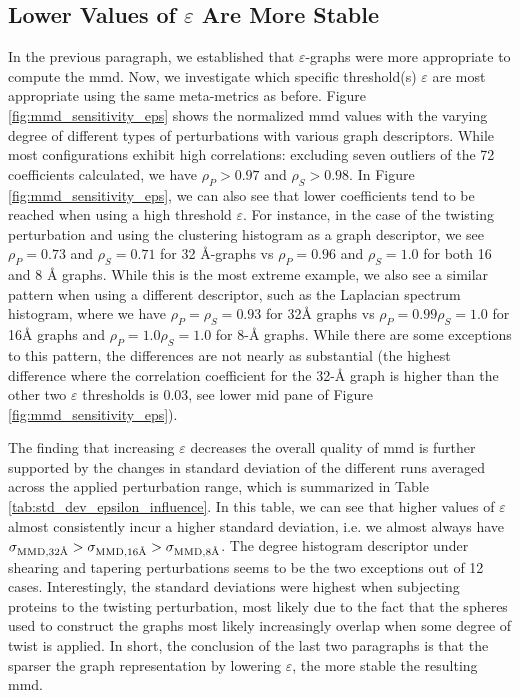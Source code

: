 \subsection{Lower Values of $\varepsilon$ Are More Stable}
\label{sec:sparser_better}
In the previous paragraph, we established that $\varepsilon$-graphs were more
appropriate to compute the \gls{mmd}. Now, we investigate which specific
threshold(s) $\varepsilon$ are most appropriate using the same meta-metrics as
before. Figure \ref{fig:mmd_sensitivity_eps} shows the normalized \gls{mmd} values
with the varying degree of different types of perturbations with various graph
descriptors. While most configurations exhibit high correlations: excluding
seven outliers of the 72 coefficients calculated, we have $\rho_P>0.97$ and
$\rho_S>0.98$. In Figure \ref{fig:mmd_sensitivity_eps}, we can also see that
lower coefficients tend to be reached when using a high threshold $\varepsilon$.
For instance, in the case of the twisting perturbation and using the clustering
histogram as a graph descriptor, we see $\rho_P=0.73$ and $\rho_S=0.71$ for 32
\si{\angstrom}-graphs vs $\rho_P=0.96$ and $\rho_S=1.0$ for both 16 and 8
\si{\angstrom} graphs. While this is the most extreme example, we also see a
similar pattern when using a different descriptor, such as the Laplacian
spectrum histogram, where we have $\rho_P=\rho_S=0.93$ for 32\si{\angstrom}
graphs vs $\rho_P=0.99 \rho_S=1.0$ for 16\si{\angstrom} graphs and $\rho_P=1.0
\rho_S=1.0$ for 8-\si{\angstrom} graphs. While there are some exceptions to this
pattern, the differences are not nearly as substantial (the highest difference
where the correlation coefficient for the 32-\si{\angstrom} graph is higher than
the other two $\varepsilon$ thresholds is 0.03, see lower mid pane of Figure
\ref{fig:mmd_sensitivity_eps}).

The finding that increasing $\varepsilon$ decreases the overall quality of \gls{mmd}
is further supported by the changes in standard deviation of the different runs
averaged across the applied perturbation range, which is summarized in Table
\ref{tab:std_dev_epsilon_influence}. In this table, we can see that higher
values of $\varepsilon$ almost consistently incur a higher standard deviation,
i.e. we almost always have $\sigma_{\text{MMD}, 32\si{\angstrom}}>\sigma_{\text{MMD},
  16\si{\angstrom}}>\sigma_{\text{MMD}, 8\si{\angstrom}}$. The degree histogram descriptor under shearing
and tapering perturbations seems to be the two exceptions out of 12 cases.
Interestingly, the standard deviations were highest when subjecting proteins to
the twisting perturbation, most likely due to the fact that the spheres used to
construct the graphs most likely increasingly overlap when some degree of twist
is applied. In short, the conclusion of the last two paragraphs is that the
sparser the graph representation by lowering $\varepsilon$, the more stable the
resulting \gls{mmd}.

